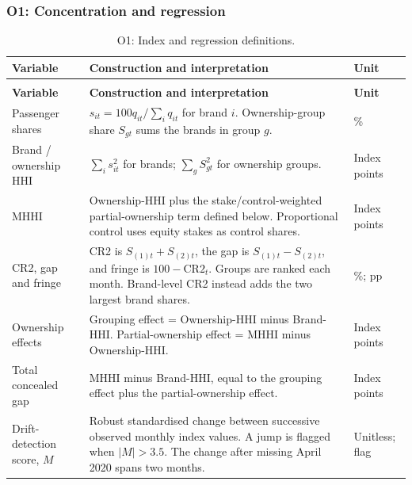 \subsubsection{O1: Concentration and regression}
\label{app:o1-definitions}
\begingroup
\color{black}\small{}
\renewcommand{\arraystretch}{1.2}
\setlength{\tabcolsep}{5pt}
\captionsetup{font=small,labelfont=bf,justification=centering,singlelinecheck=false,skip=6pt}
\begin{longtable}{|>{\raggedright\arraybackslash}p{}|>{\raggedright\arraybackslash}p{}|>{\raggedright\arraybackslash}p{}|}
\caption{O1: Index and regression definitions.}\label{tab:team-o1-variables}\\
\hline
\textbf{Variable} & \textbf{Construction and interpretation} & \textbf{Unit} \\
\hline
\endfirsthead
\multicolumn{3}{c}{\small Table~\thetable\ (continued)}\\[4pt]
\hline
\textbf{Variable} & \textbf{Construction and interpretation} & \textbf{Unit} \\
\hline
\endhead
Passenger shares & $s_{it}=100q_{it}/\sum_i q_{it}$ for brand $i$. Ownership-group share $S_{gt}$ sums the brands in group $g$. & \% \\
\hline
Brand / ownership HHI & $\sum_i s_{it}^{2}$ for brands; $\sum_g S_{gt}^{2}$ for ownership groups. & Index points \\
\hline
MHHI & Ownership-HHI plus the stake/control-weighted partial-ownership term defined below. Proportional control uses equity stakes as control shares. & Index points \\
\hline
CR2, gap and fringe & CR2 is $S_{(1)t}+S_{(2)t}$, the gap is $S_{(1)t}-S_{(2)t}$, and fringe is $100-\mathrm{CR2}_t$. Groups are ranked each month. Brand-level CR2 instead adds the two largest brand shares. & \%; pp \\
\hline
Ownership effects & Grouping effect = Ownership-HHI minus Brand-HHI. Partial-ownership effect = MHHI minus Ownership-HHI. & Index points \\
\hline
Total concealed gap & MHHI minus Brand-HHI, equal to the grouping effect plus the partial-ownership effect. & Index points \\
\hline
Drift-detection score, $M$ & Robust standardised change between successive observed monthly index values. A jump is flagged when $|M|>3.5$. The change after missing April 2020 spans two months. & Unitless; flag \\

\end{longtable}
